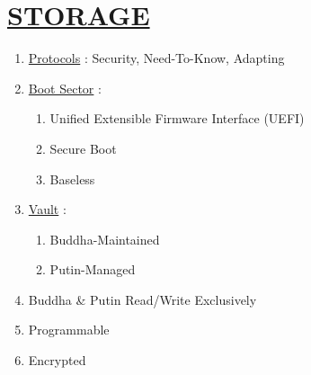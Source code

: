 \documentclass[11pt]{article}
\begin{document}
\section*{\ul{STORAGE}}
\begin{enumerate}
	\item[] \ul{Protocols} : Security, Need-To-Know, Adapting
	
	\item[] \ul{Boot Sector} :
	\begin{enumerate}
		\item[] Unified Extensible Firmware Interface (UEFI)
		\item[] Secure Boot
		\item[] Baseless
	\end{enumerate}

	\item[] \ul{Vault} :
	\begin{enumerate}
		\item[] Buddha-Maintained
		\item[] Putin-Managed
	\end{enumerate}
	
	\item[] Buddha \& Putin Read/Write Exclusively
	\item[] Programmable
	\item[] Encrypted
\end{enumerate}
\end{document}
